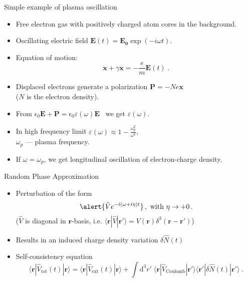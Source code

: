 \documentclass{beamer}
\begin{document}
\begin{frame}{Simple example of plasma oscillation}
    \begin{itemize}
    \item Free electron gas with positively charged atom cores in the background.
    \item Oscillating electric field $\mathbf{E}(t) = \mathbf{E_0}\exp(-i\omega t)$.
    \item Equation of motion: \[ \mathbf{\ddot{x}} + \gamma\mathbf{\dot{x}} = -\frac{e}{m}\mathbf{E}(t)\; .\]
    \item Displaced electrons generate a polarization $\mathbf{P} = -Ne\mathbf{x}$ \\ ($N$ is the electron density).
    \item From $\epsilon_0\mathbf{E} + \mathbf{P} = \epsilon_0\varepsilon(\omega)\mathbf{E}$ \ we get $\varepsilon(\omega)$.
    \item In high frequency limit $\varepsilon(\omega) \approx 1 - \frac{\omega_p^2}{\omega^2}$, \\ $\omega_p$ --- \alert{plasma frequency}.
    \item If $\omega = \omega_p$, we get longitudinal oscillation of electron-charge density.
    \end{itemize}
\end{frame}

\begin{frame}{Random Phase Approximation}
    \begin{itemize}
    \item Perturbation of the form
        \[ \alert{\hat V e^{-i(\omega + i\eta)t}}\,,\text{ with }\eta \to +0\,. \]
        \small{($\hat V$ is diagonal in $\mathbf{r}$-basis, i.e. $\langle\mathbf{r}|\hat V|\mathbf{r'}\rangle = V(\mathbf{r})\delta^3(\mathbf{r} - \mathbf{r'})$)}
    \item Results in an induced charge density variation $\delta\hat N(t)$
    \item \alert{Self-consistency equation}
        \[ \langle \mathbf{r} | \hat V_\text{tot}(t) | \mathbf{r} \rangle
            = \langle \mathbf{r} | \hat V_\text{ext}(t) | \mathbf{r} \rangle + \int\!\! \text{d}^3 r' \; \langle \mathbf{r} | \hat V_\text{Coulomb} | \mathbf{r'} \rangle \langle \mathbf{r'} | \delta\hat N(t) | \mathbf{r'} \rangle \;. \]
    \end{itemize}
\end{frame}
\end{document}
